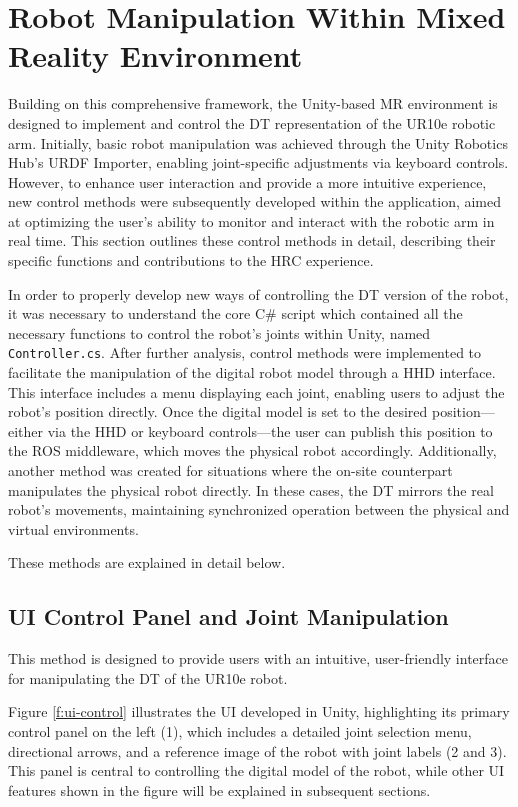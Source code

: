 \section{Robot Manipulation Within Mixed Reality Environment}

Building on this comprehensive framework, the Unity-based \ac{MR} environment is designed to implement and control the \ac{DT} representation of the UR10e robotic arm. Initially, basic robot manipulation was achieved through the Unity Robotics Hub's \ac{URDF} Importer, enabling joint-specific adjustments via keyboard controls. However, to enhance user interaction and provide a more intuitive experience, new control methods were subsequently developed within the application, aimed at optimizing the user’s ability to monitor and interact with the robotic arm in real time. This section outlines these control methods in detail, describing their specific functions and contributions to the \ac{HRC} experience.

In order to properly develop new ways of controlling the \ac{DT} version of the robot, it was necessary to understand the core C\# script which contained all the necessary functions to control the robot's joints within Unity, named \texttt{Controller.cs}. After further analysis, control methods were implemented to facilitate the manipulation of the digital robot model through a \ac{HHD} interface. This interface includes a menu displaying each joint, enabling users to adjust the robot’s position directly. Once the digital model is set to the desired position—either via the \ac{HHD} or keyboard controls—the user can publish this position to the \ac{ROS} middleware, which moves the physical robot accordingly. Additionally, another method was created for situations where the on-site counterpart manipulates the physical robot directly. In these cases, the \ac{DT} mirrors the real robot’s movements, maintaining synchronized operation between the physical and virtual environments.

These methods are explained in detail below.


\subsection{UI Control Panel and Joint Manipulation}
\label{subsection:ui-control-method}
This method is designed to provide users with an intuitive, user-friendly interface for manipulating the \ac{DT} of the UR10e robot. 

Figure \ref{f:ui-control} illustrates the \ac{UI} developed in Unity, highlighting its primary control panel on the left (1), which includes a detailed joint selection menu, directional arrows, and a reference image of the robot with joint labels (2 and 3). This panel is central to controlling the digital model of the robot, while other \ac{UI} features shown in the figure will be explained in subsequent sections.

